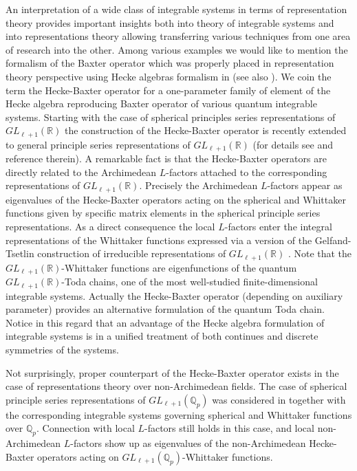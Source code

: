 \documentclass[12pt]{article}
\def\IQ{\mathbb{Q}}
\def\IR{\mathbb{R}}
\begin{document}
An interpretation of a wide class of integrable systems in terms of
representation theory provides  important insights both into  theory
of integrable systems and into representations theory
allowing  transferring various techniques from one  area of research
into the other. Among various examples we would like to mention the
formalism of the Baxter operator \cite{Ba} which was properly placed in
representation theory perspective using  Hecke
algebras formalism in \cite{GLO08} (see also \cite{G}).
We coin the term the Hecke-Baxter operator for a
one-parameter family of element of the Hecke algebra reproducing Baxter operator
of various quantum integrable systems.
Starting with the case of spherical principles series
representations of $GL_{\ell+1}(\IR)$ the construction of the
Hecke-Baxter operator  is recently extended
to general principle series representations of $GL_{\ell+1}(\IR)$
  (for details see \cite{GLO25} and reference therein).  A remarkable fact is
that the Hecke-Baxter operators  are directly related to
the Archimedean $L$-factors attached to the corresponding
representations of $GL_{\ell+1}(\IR)$. Precisely the Archimedean $L$-factors appear
as eigenvalues of the Hecke-Baxter operators  acting on  the
spherical and Whittaker functions given by specific matrix elements in the
spherical principle series  representations.
As a direct consequence  the local $L$-factors enter the integral
representations of the Whittaker functions expressed via a version of the
Gelfand-Tsetlin construction of irreducible representations of
$GL_{\ell+1}(\IR)$ \cite{GKL}. Note that the $GL_{\ell+1}(\IR)$-Whittaker
functions are eigenfunctions  of the
quantum $GL_{\ell+1}(\IR)$-Toda chains,  one of the most well-studied
finite-dimensional integrable systems. Actually  the Hecke-Baxter
operator (depending on auxiliary parameter) provides an alternative
formulation of the quantum Toda chain.
Notice in this regard that an advantage of the Hecke algebra
formulation of integrable systems  is in a unified treatment
of both continues and discrete  symmetries of the systems.


Not surprisingly,  proper counterpart of the Hecke-Baxter operator exists  in the case
of representations theory over non-Archimedean fields. The case of
spherical principle series representations of $GL_{\ell+1}(\IQ_p)$ was
considered in \cite{GLO08} together with the
corresponding integrable systems governing spherical and Whittaker
functions over $\IQ_p$. Connection with local $L$-factors
still holds in this case, and local non-Archimedean $L$-factors show up as eigenvalues
of the non-Archimedean Hecke-Baxter operators  acting on
$GL_{\ell+1}(\IQ_p)$-Whittaker functions.
\end{document}

